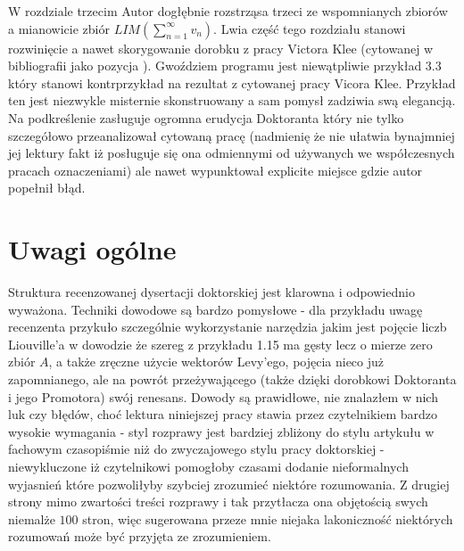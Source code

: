 \documentclass[12pt]{article}
\begin{document}
  W rozdziale trzecim Autor dogłębnie rozstrząsa 
trzeci ze wspomnianych zbiorów a mianowicie
zbiór $LIM(\sum_{n=1}^\infty v_n)$. Lwia część 
tego rozdziału stanowi rozwinięcie a nawet
skorygowanie dorobku z pracy Victora Klee
(cytowanej w bibliografii jako pozycja \big[28\big]).
Gwoździem programu jest niewątpliwie przykład
3.3 który stanowi kontrprzykład na rezultat
z cytowanej pracy Vicora Klee. Przykład ten
jest niezwykle misternie skonstruowany a
sam pomysł zadziwia swą elegancją. Na podkreślenie zasługuje 
ogromna erudycja Doktoranta który nie tylko
szczegółowo przeanalizował cytowaną
pracę (nadmienię że nie ułatwia bynajmniej jej lektury fakt
iż posługuje się ona odmiennymi od 
używanych we współczesnych pracach oznaczeniami)
ale nawet wypunktował explicite miejsce gdzie autor 
popełnił błąd.

\section{Uwagi ogólne}

  Struktura recenzowanej dysertacji doktorskiej jest
klarowna i odpowiednio wyważona. Techniki dowodowe 
są bardzo pomysłowe - dla przykładu uwagę recenzenta 
przykuło szczególnie wykorzystanie narzędzia jakim jest
pojęcie liczb Liouville'a w dowodzie że szereg z przykładu
1.15 ma gęsty lecz o mierze zero zbiór $A$, a także
zręczne użycie wektorów Levy'ego, pojęcia nieco już 
zapomnianego, ale na powrót 
przeżywającego (także dzięki dorobkowi Doktoranta i jego Promotora) 
swój renesans. 
  Dowody są prawidłowe, nie znalazłem w nich luk czy 
błędów, choć lektura niniejszej pracy stawia przez
czytelnikiem bardzo wysokie wymagania - styl rozprawy
jest bardziej zbliżony do stylu artykułu w fachowym czasopiśmie
niż do zwyczajowego stylu pracy doktorskiej - niewykluczone
iż czytelnikowi pomogłoby czasami dodanie nieformalnych
wyjasnień które pozwoliłyby szybciej zrozumieć niektóre 
rozumowania. Z drugiej strony mimo zwartości treści 
rozprawy i tak przytłacza ona objętością swych niemalże
$100$ stron, więc sugerowana przeze mnie niejaka lakoniczność
niektórych rozumowań może być przyjęta ze zrozumieniem.

\end{document}
